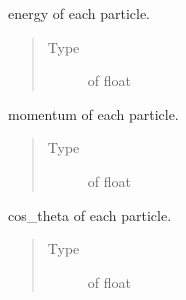\documentclass[letterpaper,10pt,english]{sphinxmanual}
\begin{document}
\begin{fulllineitems}
\begin{fulllineitems}
\label{\detokenize{code_structure:scdc.particle.ParticleCollection.energy}}
energy of each particle.
\begin{quote}\begin{description}
\item[{Type}] \leavevmode
{} of float

\end{description}\end{quote}

\end{fulllineitems}


\begin{fulllineitems}
\label{\detokenize{code_structure:scdc.particle.ParticleCollection.momentum}}
momentum of each particle.
\begin{quote}\begin{description}
\item[{Type}] \leavevmode
{} of float

\end{description}\end{quote}

\end{fulllineitems}


\begin{fulllineitems}
\label{\detokenize{code_structure:scdc.particle.ParticleCollection.cos_theta}}
cos\_theta of each particle.
\begin{quote}\begin{description}
\item[{Type}] \leavevmode
{} of float

\end{description}\end{quote}

\end{fulllineitems}


\end{fulllineitems}
\end{document}
